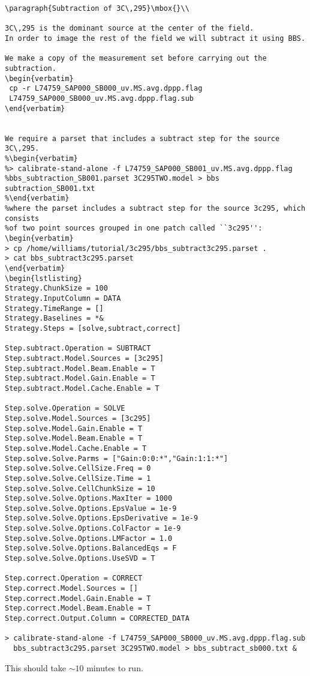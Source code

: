 \begin{lstlisting}
\paragraph{Subtraction of 3C\,295}\mbox{}\\

3C\,295 is the dominant source at the center of the field. 
In order to image the rest of the field we will subtract it using BBS.

We make a copy of the measurement set before carrying out the 
subtraction.
\begin{verbatim}
 cp -r L74759_SAP000_SB000_uv.MS.avg.dppp.flag 
 L74759_SAP000_SB000_uv.MS.avg.dppp.flag.sub
\end{verbatim}


We require a parset that includes a subtract step for the source 3C\,295. 
%\begin{verbatim}
%> calibrate-stand-alone -f L74759_SAP000_SB001_uv.MS.avg.dppp.flag
%bbs_subtraction_SB001.parset 3C295TWO.model > bbs subtraction_SB001.txt
%\end{verbatim}
%where the parset includes a subtract step for the source 3c295, which consists
%of two point sources grouped in one patch called ``3c295'':
\begin{verbatim}
> cp /home/williams/tutorial/3c295/bbs_subtract3c295.parset .
> cat bbs_subtract3c295.parset
\end{verbatim}
\begin{lstlisting}
Strategy.ChunkSize = 100
Strategy.InputColumn = DATA
Strategy.TimeRange = []
Strategy.Baselines = *&
Strategy.Steps = [solve,subtract,correct]

Step.subtract.Operation = SUBTRACT
Step.subtract.Model.Sources = [3c295]
Step.subtract.Model.Beam.Enable = T
Step.subtract.Model.Gain.Enable = T
Step.subtract.Model.Cache.Enable = T

Step.solve.Operation = SOLVE
Step.solve.Model.Sources = [3c295]
Step.solve.Model.Gain.Enable = T
Step.solve.Model.Beam.Enable = T
Step.solve.Model.Cache.Enable = T
Step.solve.Solve.Parms = ["Gain:0:0:*","Gain:1:1:*"]
Step.solve.Solve.CellSize.Freq = 0
Step.solve.Solve.CellSize.Time = 1
Step.solve.Solve.CellChunkSize = 10
Step.solve.Solve.Options.MaxIter = 1000
Step.solve.Solve.Options.EpsValue = 1e-9
Step.solve.Solve.Options.EpsDerivative = 1e-9
Step.solve.Solve.Options.ColFactor = 1e-9
Step.solve.Solve.Options.LMFactor = 1.0
Step.solve.Solve.Options.BalancedEqs = F
Step.solve.Solve.Options.UseSVD = T

Step.correct.Operation = CORRECT
Step.correct.Model.Sources = []
Step.correct.Model.Gain.Enable = T
Step.correct.Model.Beam.Enable = T
Step.correct.Output.Column = CORRECTED_DATA

> calibrate-stand-alone -f L74759_SAP000_SB000_uv.MS.avg.dppp.flag.sub 
  bbs_subtract3c295.parset 3C295TWO.model > bbs_subtract_sb000.txt &
\end{lstlisting}
This should take $\sim10$ minutes to run.

